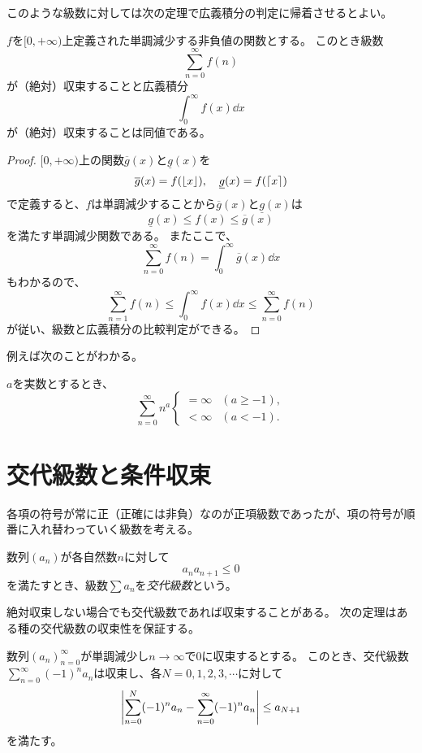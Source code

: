 このような級数に対しては次の定理で広義積分の判定に帰着させるとよい。

\begin{theorem}[級数と広義積分の比較]
$f$を$[0, +\infty)$上定義された単調減少する非負値の関数とする。
このとき級数
$$
\sum_{n = 0}^\infty f(n)
$$
が（絶対）収束することと広義積分
$$
\int_0^\infty f(x)\dd{x}
$$
が（絶対）収束することは同値である。
\end{theorem}

\begin{proof}
$[0, +\infty)$上の関数$\overline{g}(x)$と$\underline{g}(x)$を
$$
\overline{g}(x) = f(\lfloor x\rfloor),
\quad \underline{g}(x) = f(\lceil x\rceil)
$$
で定義すると、$f$は単調減少することから$\overline{g}(x)$と$\underline{g}(x)$は
$$
\underline{g}(x) \le f(x) \le \overline{g}(x)
$$
を満たす単調減少関数である。
またここで、
$$
\sum_{n = 0}^\infty f(n) = \int_0^\infty \overline{g}(x)\dd{x}
$$
もわかるので、
$$
\sum_{n = 1}^\infty f(n) \le \int_0^\infty f(x)\dd{x} \le \sum_{n = 0}^\infty f(n)
$$
が従い、級数と広義積分の比較判定ができる。
\end{proof}

例えば次のことがわかる。

\begin{proposition}
$a$を実数とするとき、
$$
\sum_{n = 0}^\infty n^a
\begin{cases}
= \infty & (a \ge -1), \\
< \infty & (a < -1).
\end{cases}
$$
\end{proposition}

\section{交代級数と条件収束}

各項の符号が常に正（正確には非負）なのが正項級数であったが、項の符号が順番に入れ替わっていく級数を考える。

\begin{definition}[交代級数]
数列$(a_n)$が各自然数$n$に対して
$$
a_n a_{n+1} \le 0
$$
を満たすとき、級数$\sum a_n$を\emph{交代級数}という。
\end{definition}

絶対収束しない場合でも交代級数であれば収束することがある。
次の定理はある種の交代級数の収束性を保証する。

\begin{theorem}[ライプニッツの判定法]
数列$(a_n)_{n = 0}^\infty$が単調減少し$n \to \infty$で$0$に収束するとする。
このとき、交代級数$\sum_{n = 0}^\infty (-1)^n a_n$は収束し、各$N = 0, 1, 2, 3, \cdots$に対して
$$
\abs{\sum_{n = 0}^N (-1)^n a_n-\sum_{n = 0}^\infty (-1)^n a_n} \le a_{N+1}
$$
を満たす。
\end{theorem}

